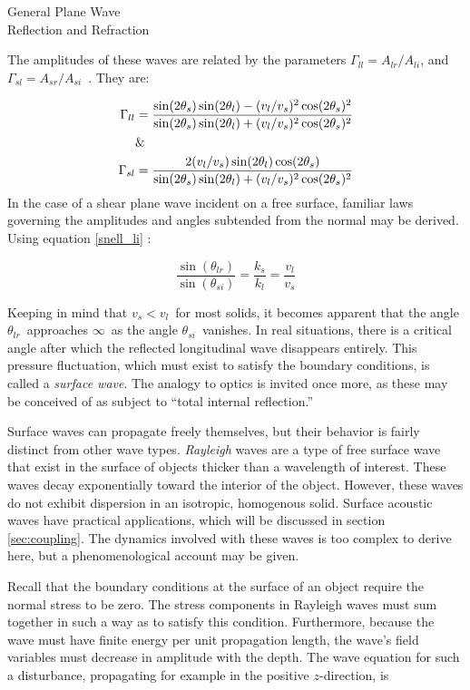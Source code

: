 \documentclass[a4paper,10pt]{report}
\numberwithin{equation}{section}
\begin{document}
{\begin{chapter}
\begin{section}{General Plane Wave \\Reflection and Refraction}
\par
The amplitudes of these waves are related by the parameters $\Gamma_{ll} = A_{lr} / A_{li}$, and $\Gamma_{sl} = A_{sr} / A_{si}$\  . They are: \cite[p.~98]{Kino1987}
\par
\begin{align}
\Gamma_{ll} &= \frac{\sin(2\theta_s)\sin(2\theta_l) - (v_l / v_s)^2\cos(2\theta_s)^2}{\sin(2\theta_s)\sin(2\theta_l) + (v_l / v_s)^2\cos(2\theta_s)^2}\\
&\text{\&}\notag\\
\Gamma_{sl} &= \frac{2(v_l/v_s) \sin(2\theta_l)\cos(2\theta_s)}{\sin(2\theta_s)\sin(2\theta_l) + (v_l / v_s)^2\cos(2\theta_s)^2}
\end{align}
In the case of a shear plane wave incident on a free surface, familiar laws governing the amplitudes and angles subtended from the normal may be derived. Using equation \eqref{snell_li} :
\par
\begin{equation}
\frac{\sin(\theta_{lr})}{\sin(\theta_{si})} = \frac{k_s}{k_l} = \frac{v_l}{v_s}
\end{equation}
\par
Keeping in mind that $v_s < v_l$\  for most solids, it becomes apparent that the angle $\theta_{lr}$\  approaches $\infty$\  as the angle $\theta_{si}$\  vanishes. In real situations, there is a critical angle after which the reflected longitudinal wave disappears entirely. This pressure fluctuation, which must exist to satisfy the boundary conditions, is called a \emph{surface wave}. The analogy to optics is invited once more, as these may be conceived of as subject to ``total internal reflection.''\cite[p.~145]{Cremer1973} 
\par
Surface waves can propagate freely themselves, but their behavior is fairly distinct from other wave types. \footnotemark  \cite[p.~150]{Cremer1973} \emph{Rayleigh} waves are a type of free surface wave that exist in the surface of objects thicker than a wavelength of interest. These waves decay exponentially toward the interior of the object. However, these waves do not exhibit dispersion in an isotropic, homogenous solid.\cite[p.~152]{Cremer1973}\cite[p.~113]{Kino1987} Surface acoustic waves have practical applications, which will be discussed in section \ref{sec:coupling}. The dynamics involved with these waves is too complex to derive here, but a phenomenological account may be given. 
\par
Recall that the boundary conditions at the surface of an object require the normal stress to be zero. The stress components in Rayleigh waves must sum together in such a way as to satisfy this condition. Furthermore, because the wave must have finite energy per unit propagation length, the wave's field variables must decrease in amplitude with the depth. \cite[p.~110]{Kino1987} The wave equation for such a disturbance, propagating for example in the positive $z$-direction, is \cite[p.~70]{Ballantine1997}

\end{section}
\end{chapter}}
\end{document}
